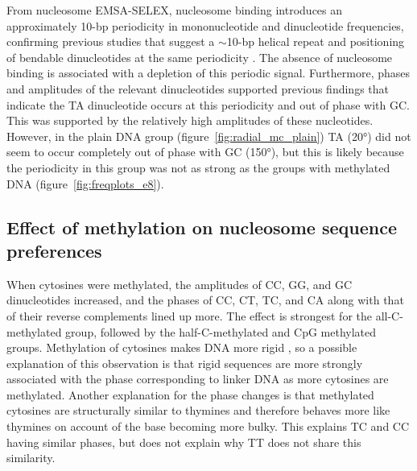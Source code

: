 \documentclass[parskip=full, numbers=noenddot]{scrreprt}
\begin{document}

From nucleosome EMSA-SELEX, nucleosome binding introduces an approximately 10-bp periodicity in mononucleotide and dinucleotide frequencies, confirming previous studies that suggest a $\sim$10-bp helical repeat and positioning of bendable dinucleotides at the same periodicity \citep{struhl_determinants_2013}.  The absence of nucleosome binding is associated with a depletion of this periodic signal.  Furthermore, phases and amplitudes of the relevant dinucleotides supported previous findings that indicate the TA dinucleotide occurs at this periodicity and out of phase with GC.  This was supported by the relatively high amplitudes of these nucleotides.  However, in the plain DNA group (figure~\ref{fig:radial_mc_plain}) TA (\ang{20}) did not seem to occur completely out of phase with GC (\ang{150}), but this is likely because the periodicity in this group was not as strong as the groups with methylated DNA (figure~\ref{fig:freqplots_e8}).  %


\subsection{Effect of methylation on nucleosome sequence preferences}
\label{ssec:emsaselex_discussion_methyl}


When cytosines were methylated, the amplitudes of CC, GG, and GC dinucleotides increased, and the phases of CC, CT, TC, and CA along with that of their reverse complements lined up more.  The effect is strongest for the all-C-methylated group, followed by the half-C-methylated and CpG methylated groups.  Methylation of cytosines makes DNA more rigid \citep{rao_systematic_2018, perez_impact_2012}, so a possible explanation of this observation is that rigid sequences are more strongly associated with the phase corresponding to linker DNA as more cytosines are methylated.  Another explanation for the phase changes is that methylated cytosines are structurally similar to thymines and therefore behaves more like thymines on account of the base becoming more bulky.  This explains TC and CC having similar phases, but does not explain why TT does not share this similarity.
\end{document}
